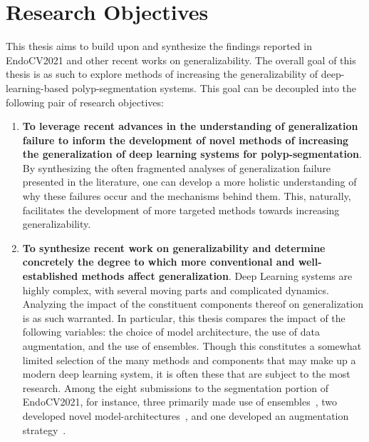     \section{Research Objectives}
    This thesis aims to build upon and synthesize the findings reported in EndoCV2021 and other recent works on generalizability. The overall goal of this thesis is as such to explore methods of increasing the generalizability of deep-learning-based polyp-segmentation systems. This goal can be decoupled into the following pair of research objectives:
    \begin{enumerate}
        \item \textbf{To leverage recent advances in the understanding of generalization failure to inform the development of novel methods of increasing the generalization of deep learning systems for polyp-segmentation}. By synthesizing the often fragmented analyses of generalization failure presented in the literature, one can develop a more holistic understanding of why these failures occur and the mechanisms behind them. This, naturally, facilitates the development of more targeted methods towards increasing generalizability. \label{cont_1}

        \item \textbf{To synthesize recent work on generalizability and determine concretely the degree to which more conventional and well-established methods affect generalization}. Deep Learning systems are highly complex, with several moving parts and complicated dynamics. Analyzing the impact of the constituent components thereof on generalization is as such warranted. In particular, this thesis compares the impact of the following variables: the choice of model architecture, the use of data augmentation, and the use of ensembles. Though this constitutes a somewhat limited selection of the many methods and components that may make up a modern deep learning system, it is often these that are subject to the most research. Among the eight submissions to the segmentation portion of EndoCV2021, for instance, three primarily made use of ensembles~\cite{endocv2021_ensemble_3, divergentnets, endoensemble}, two developed novel model-architectures~\cite{endocv2021_gru, doubleencdec}, and one developed an augmentation strategy~\cite{polyp_augmentation}.  \label{cont_2}
    \end{enumerate}
   
